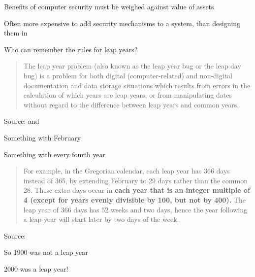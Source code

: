 \documentclass[Screen16to9,17pt]{foils}
\begin{document}

\begin{list1}
\item Benefits of computer security must be weighed against value of assets
\item Often more expensive to add security mechanisms to a system, than designing them in
\end{list1}




Who can remember the rules for leap years?

\begin{quote}
The leap year problem (also known as the leap year bug or the leap day bug) is a problem for both digital (computer-related) and non-digital documentation and data storage situations which results from errors in the calculation of which years are leap years, or from manipulating dates without regard to the difference between leap years and common years.
\end{quote}
Source:  and

\begin{list2}
\item Something with February
\item Something with every fourth year
\end{list2}



\begin{quote}
For example, in the Gregorian calendar, each leap year has 366 days instead of 365, by extending February to 29 days rather than the common 28. These extra days occur in {\bf each year that is an integer multiple of 4 (except for years evenly divisible by 100, but not by 400).} The leap year of 366 days has 52 weeks and two days, hence the year following a leap year will start later by two days of the week.
\end{quote}
Source: 

\begin{list2}
\item So 1900 was not a leap year
\item 2000 was a leap year!
\end{list2}
\end{document}
